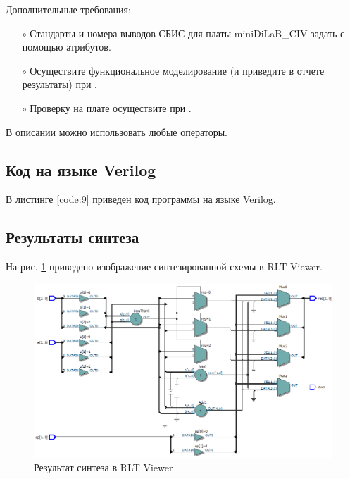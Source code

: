 Дополнительные требования:
\begin{itemize}
	\item[$\circ$] Стандарты и номера выводов СБИС для платы miniDiLaB\_CIV задать с помощью атрибутов.
	\item[$\circ$] Осуществите функциональное моделирование (и приведите в отчете результаты) при .
	\item[$\circ$] Проверку на плате осуществите при .
\end{itemize}

В описании можно использовать любые операторы.

\subsection{Код на языке Verilog}

В листинге \ref{code:9} приведен код программы на языке Verilog.



\newpage

\subsection{Результаты синтеза}

На рис. \ref{fig:elab5_1_rtl} приведено изображение синтезированной схемы в RLT Viewer.

\begin{figure}[H]
\begin{center}
	\includegraphics[width=\textwidth]{elab5_1_rtl}
	\caption{Результат синтеза в RLT Viewer}
	\label{fig:elab5_1_rtl}
\end{center}
\end{figure}

